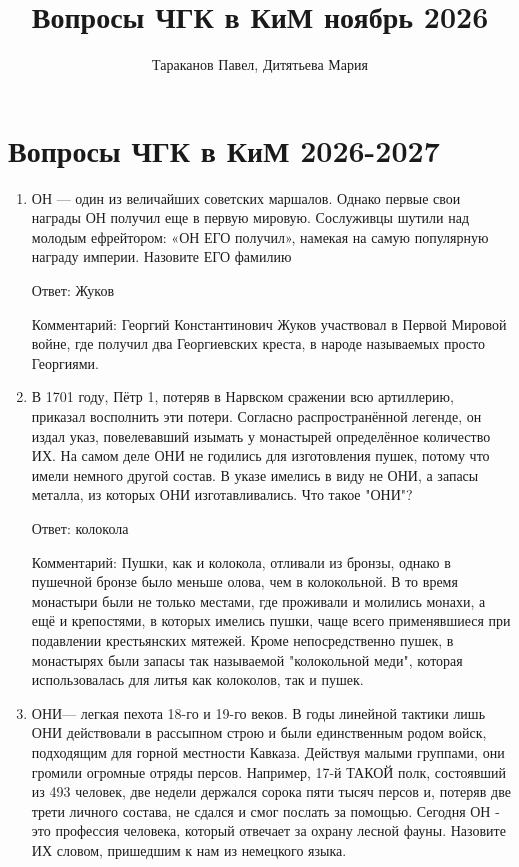 \documentclass[oneside,final,14pt]{extreport}
\title{\textbf{Вопросы ЧГК в КиМ ноябрь 2026}}
\author{Тараканов Павел, Дитятьева Мария}
\begin{document}
\maketitle

\section*{Вопросы ЧГК в КиМ 2026-2027}
\begin{enumerate}
    \item ОН — один из величайших советских маршалов. Однако первые свои награды ОН получил еще в первую мировую. Сослуживцы шутили над молодым ефрейтором: «ОН ЕГО получил», намекая на самую популярную награду империи. Назовите ЕГО фамилию

    Ответ: Жуков

    Комментарий: Георгий Константинович Жуков участвовал в Первой Мировой войне, где получил два Георгиевских креста, в народе называемых просто Георгиями.

    \item В 1701 году, Пётр 1, потеряв в Нарвском сражении всю артиллерию, приказал восполнить эти потери. Согласно распространённой легенде, он издал указ, повелевавший изымать у монастырей определённое количество ИХ. На самом деле ОНИ не годились для изготовления пушек, потому что имели немного другой состав. В указе имелись в виду не ОНИ, а запасы металла, из которых ОНИ изготавливались. Что такое "ОНИ"?

    Ответ: колокола

    Комментарий: Пушки, как и колокола, отливали из бронзы, однако в пушечной бронзе было меньше олова, чем в колокольной. В то время монастыри были не только местами, где проживали и молились монахи, а ещё и крепостями, в которых имелись пушки, чаще всего применявшиеся при подавлении крестьянских мятежей. Кроме непосредственно пушек, в монастырях были запасы так называемой "колокольной меди", которая использовалась для литья как колоколов, так и пушек.

    \item ОНИ— легкая пехота  18-го и 19-го веков. В годы линейной тактики лишь ОНИ  действовали в рассыпном строю и были единственным родом войск, подходящим для горной местности Кавказа. Действуя малыми группами, они громили огромные отряды персов. Например, 17-й ТАКОЙ полк, состоявший из 493 человек, две недели держался сорока пяти тысяч персов и, потеряв две трети личного состава, не сдался и смог послать за помощью. Сегодня ОН - это профессия человека, который отвечает за охрану лесной фауны. Назовите ИХ словом, пришедшим к нам из немецкого языка.


\end{enumerate}
\end{document}
